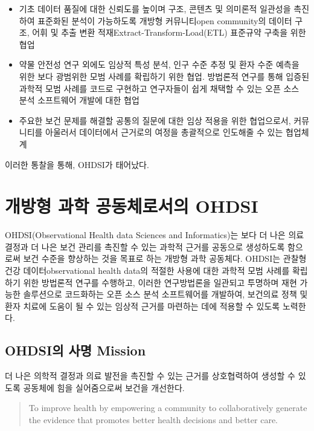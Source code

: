 \documentclass[11pt]{book}
\providecommand{\tightlist}{%
  \setlength{\itemsep}{0pt}\setlength{\parskip}{0pt}}
\theoremstyle{definition}
\theoremstyle{definition}
\theoremstyle{definition}
\theoremstyle{remark}
\begin{document}
\begin{itemize}
\tightlist
\item
  기초 데이터 품질에 대한 신뢰도를 높이며 구조, 콘텐츠 및 의미론적
  일관성을 촉진하여 표준화된 분석이 가능하도록 개방형 커뮤니티open
  community의 데이터 구조, 어휘 및 추출 변환
  적재Extract-Transform-Load(ETL) 표준규약 구축을 위한 협업
\item
  약물 안전성 연구 외에도 임상적 특성 분석, 인구 수준 추정 및 환자 수준
  예측을 위한 보다 광범위한 모범 사례를 확립하기 위한 협업. 방법론적
  연구를 통해 입증된 과학적 모범 사례를 코드로 구현하고 연구자들이 쉽게
  채택할 수 있는 오픈 소스 분석 소프트웨어 개발에 대한 협업
\item
  주요한 보건 문제를 해결할 공통의 질문에 대한 임상 적용을 위한
  협업으로서, 커뮤니티를 아울러서 데이터에서 근거로의 여정을 총괄적으로
  인도해줄 수 있는 협업체계
\end{itemize}

이러한 통찰을 통해, OHDSI가 태어났다.

\section{개방형 과학 공동체로서의 OHDSI}\label{---ohdsi}

OHDSI(Observational Health data Sciences and Informatics)는 보다 더 나은
의료 결정과 더 나은 보건 관리를 촉진할 수 있는 과학적 근거를 공동으로
생성하도록 함으로써 보건 수준을 향상하는 것을 목표로 하는 개방형 과학
공동체다. \citep{Hripcsak2015} OHDSI는 관찰형 건강 데이터observational
health data의 적절한 사용에 대한 과학적 모범 사례를 확립하기 위한
방법론적 연구를 수행하고, 이러한 연구방법론을 일관되고 투명하며 재현
가능한 솔루션으로 코드화하는 오픈 소스 분석 소프트웨어를 개발하여,
보건의료 정책 및 환자 치료에 도움이 될 수 있는 임상적 근거를 마련하는
데에 적용할 수 있도록 노력한다.

\subsection{OHDSI의 사명 Mission}\label{ohdsi--mission}

더 나은 의학적 결정과 의료 발전을 촉진할 수 있는 근거를 상호협력하여
생성할 수 있도록 공동체에 힘을 실어줌으로써 보건을 개선한다.

\begin{quote}
To improve health by empowering a community to collaboratively generate
the evidence that promotes better health decisions and better care.
\end{quote}
\end{document}

